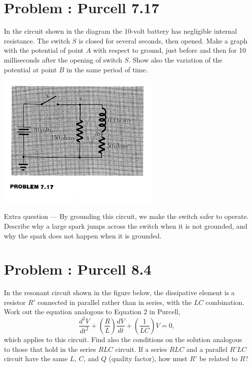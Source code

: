 \documentclass[problems]{esg8022pset}
\date{\today }
\begin{document}
\section{Problem \thesection: Purcell 7.17}
  In the circuit shown in the diagram the 10-volt battery has negligible
  internal resistance.  The switch $S$ is closed for several seconds, then
  opened.  Make a graph with the potential of point $A$ with respect to
  ground, just before and then for 10 milliseconds after the opening of
  switch $S$.  Show also the variation of the potential at point $B$ in the
  same period of time.

  \begin{center}
    \includegraphics[width = 0.6\textwidth]{figpu717}
  \end{center}

  Extra question --- By grounding this circuit, we make the switch
  safer to operate. Describe why a large spark jumps across the switch
  when it is not grounded, and why the spark does not happen when it is
  grounded.
\section{Problem \thesection: Purcell 8.4}
  In the resonant circuit shown in the figure below, the dissipative
  element is a resistor $R'$ connected in parallel rather than in series,
  with the $LC$ combination.  Work out the equation analogous to Equation 2
  in Purcell,
  \begin{equation*}
    \frac{d^2V}{dt^2} + \left(\frac{R}{L}\right)\frac{dV}{dt} + \left(\frac{1}{LC}\right)V = 0,
  \end{equation*}
  which applies to this circuit.  Find also the conditions on the solution
  analogous to those that hold in the series $RLC$ circuit.  If a series
  $RLC$ and a parallel $R'LC$ circuit have the same $L$, $C$, and $Q$
  (quality factor), how must $R'$ be related to $R$?
\end{document}
